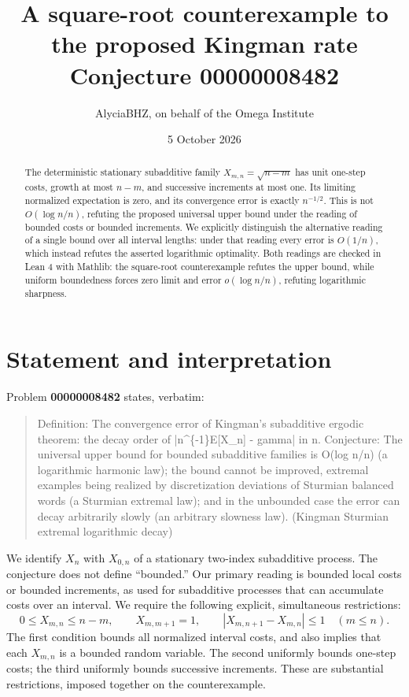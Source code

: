 \documentclass[11pt]{article}
\title{A square-root counterexample to the proposed Kingman rate\\Conjecture 00000008482}
\author{AlyciaBHZ, on behalf of the Omega Institute}
\date{5 October 2026}
\begin{document}
\maketitle
\begin{abstract}
The deterministic stationary subadditive family $X_{m,n}=\sqrt{n-m}$ has
unit one-step costs, growth at most $n-m$, and successive increments at most
one. Its limiting normalized expectation is zero, and its convergence error
is exactly $n^{-1/2}$. This is not $O(\log n/n)$, refuting the proposed
universal upper bound under the reading of bounded costs or bounded
increments. We explicitly distinguish the alternative reading of a single
bound over all interval lengths: under that reading every error is
$O(1/n)$, which instead refutes the asserted logarithmic optimality.
Both readings are checked in Lean 4 with Mathlib: the square-root
counterexample refutes the upper bound, while uniform boundedness forces
zero limit and error $o(\log n/n)$, refuting logarithmic sharpness.
\end{abstract}

\section{Statement and interpretation}
Problem \textbf{00000008482} states, verbatim:
\begin{quote}
Definition: The convergence error of Kingman's subadditive ergodic theorem: the decay order of |n\textasciicircum\{-1\}E[X\_n] - gamma| in n. Conjecture: The universal upper bound for bounded subadditive families is O(log n/n) (a logarithmic harmonic law); the bound cannot be improved, extremal examples being realized by discretization deviations of Sturmian balanced words (a Sturmian extremal law); and in the unbounded case the error can decay arbitrarily slowly (an arbitrary slowness law). (Kingman Sturmian extremal logarithmic decay)
\end{quote}
We identify $X_n$ with $X_{0,n}$ of a stationary two-index subadditive
process. The conjecture does not define ``bounded.'' Our primary reading
is bounded local costs or bounded increments, as used for subadditive
processes that can accumulate costs over an interval. We require the
following explicit, simultaneous restrictions:
\[
0\le X_{m,n}\le n-m,\qquad X_{m,m+1}=1,\qquad
|X_{m,n+1}-X_{m,n}|\le1\quad(m\le n).
\]
The first condition bounds all normalized interval costs, and also implies
that each $X_{m,n}$ is a bounded random variable. The second uniformly
bounds one-step costs; the third uniformly bounds successive increments.
These are substantial restrictions, imposed together on the counterexample.
\end{document}
